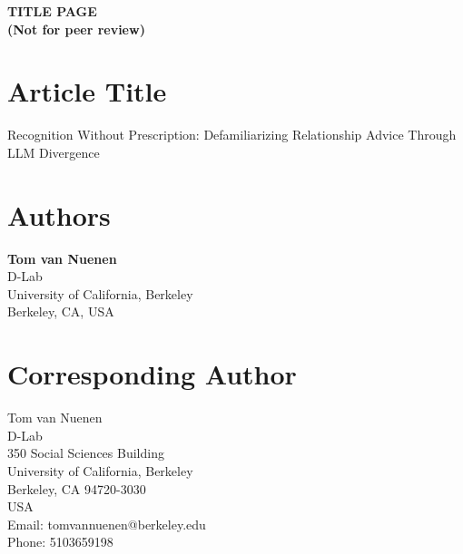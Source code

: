 \documentclass[12pt,a4paper]{article}
\begin{document}
\begin{center}
{\Large \textbf{TITLE PAGE}}\\[2em]
{\Large \textbf{(Not for peer review)}}
\end{center}

\vspace{2em}


\section*{Article Title}

Recognition Without Prescription: Defamiliarizing Relationship Advice Through LLM Divergence


\section*{Authors}

\textbf{Tom van Nuenen}\\
D-Lab\\
University of California, Berkeley\\
Berkeley, CA, USA


\section*{Corresponding Author}

Tom van Nuenen\\
D-Lab\\
350 Social Sciences Building\\
University of California, Berkeley\\
Berkeley, CA 94720-3030\\
USA\\[1em]
Email: tomvannuenen@berkeley.edu\\
Phone: 5103659198

\end{document}
